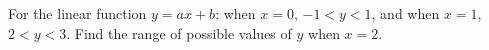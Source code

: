 For the linear function $y=ax+b$: when $x=0$, $-1<y<1$, and when $x=1$, $2<y<3$. Find the range of possible values of $y$ when $x=2$.
